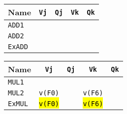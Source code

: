 \begin{enumerate}
    \begin{minipage}[t]{0.43\textwidth}
        \centering
        \begin{adjustbox}{width={\textwidth},totalheight={\textheight},keepaspectratio}
            \begin{tabular}{@{} l | c c c c @{}}
                \toprule
                Name            & \texttt{Vj}           & \texttt{Qj}                       & \texttt{Vk}           & \texttt{Qk}           \\
                \midrule
                \texttt{ADD1}   &                       &                                   &                       &                       \\ [.3em]
                \texttt{ADD2}   &                       &                                   &                       &                       \\
                \cmidrule{1-5}
                \texttt{ExADD}  &                       &                                   &                       &                       \\
                \bottomrule
            \end{tabular}
        \end{adjustbox}
    \end{minipage}
    \hfill
    \begin{minipage}[t]{0.43\textwidth}
        \centering
        \begin{adjustbox}{width={\textwidth},totalheight={\textheight},keepaspectratio}
            \begin{tabular}{@{} l | c c c c @{}}
                \toprule
                Name            & \texttt{Vj}           & \texttt{Qj}           & \texttt{Vk}           & \texttt{Qk}   \\
                \midrule
                \texttt{MUL1}   &                       &                       &                       &               \\ [.3em]
                \texttt{MUL2}   & \texttt{v(F0)}        &                       & \texttt{v(F6)}        &               \\
                \cmidrule{1-5}
                \texttt{ExMUL}  & \hl{\texttt{v(F0)}}   &                       & \hl{\texttt{v(F6)}}   &               \\
                \bottomrule
            \end{tabular}
        \end{adjustbox}
    \end{minipage}


\end{enumerate}
